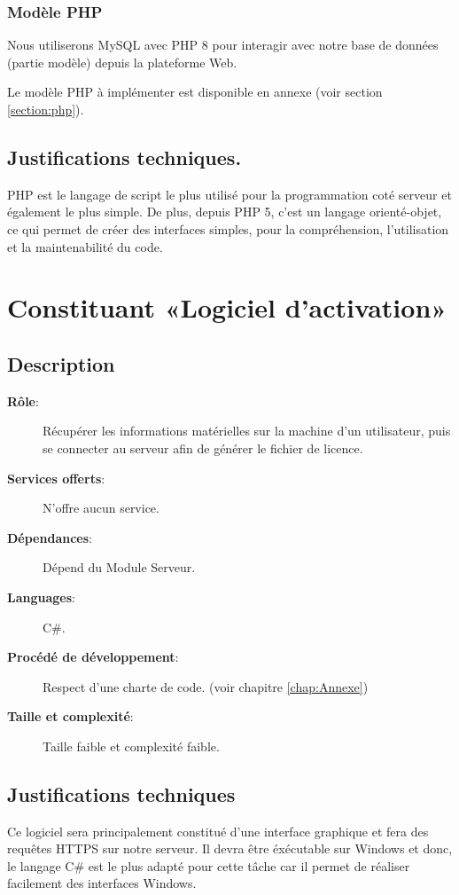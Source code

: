 \subsubsection{Modèle PHP}
Nous utiliserons MySQL avec PHP 8 pour interagir avec notre base de données (partie modèle) depuis la plateforme Web.

Le modèle PHP à implémenter est disponible en annexe (voir section \ref{section:php}).

\subsection{Justifications techniques.}
PHP est le langage de script le plus utilisé pour la programmation coté serveur et également le plus simple.
De plus, depuis PHP 5, c'est un langage orienté-objet, ce qui permet de créer des interfaces simples, pour la
compréhension, l'utilisation et la maintenabilité du code.

\section{Constituant «Logiciel d'activation»}
\subsection{Description}
\begin{description}
	\item[\textbf{Rôle}:]
		Récupérer les informations matérielles sur la machine d'un utilisateur, puis 
		se connecter au serveur afin de générer le fichier de licence.
	\item[\textbf{Services offerts}:] 
		N'offre aucun service.
	\item[\textbf{Dépendances}:]
		Dépend du Module Serveur.
	\item[\textbf{Languages}:]
		C\#.
	\item[\textbf{Procédé de développement}:]
		Respect d'une charte de code. (voir chapitre \ref{chap:Annexe})
	\item[\textbf{Taille et complexité}:]
		Taille faible et complexité faible. 
\end{description}

\subsection{Justifications techniques}
Ce logiciel sera principalement constitué d'une interface graphique et fera des requêtes HTTPS sur notre serveur.
Il devra être éxécutable sur Windows et donc, le langage C\# est le plus adapté pour cette tâche car il permet de
réaliser facilement des interfaces Windows.


